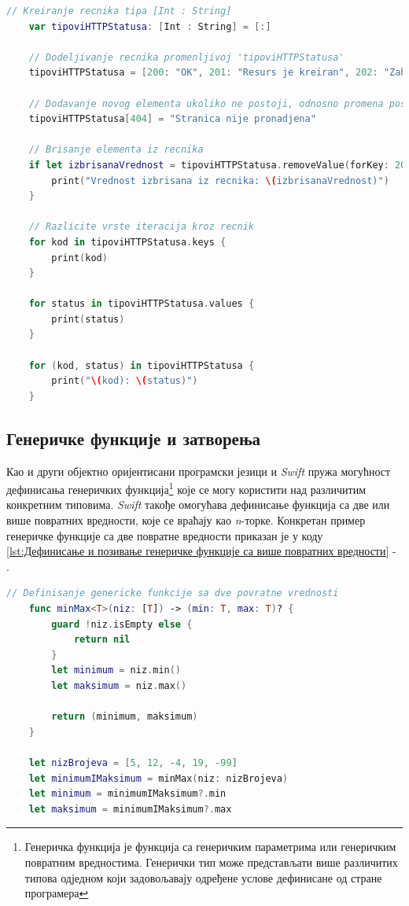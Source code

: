 \documentclass[12pt,oneside]{memoir}
\begin{document}
\begin{lstlisting}[caption=\textit{{Рад са речницима}}, label={lst:Рад са речницима}, language=Swift, frame=single]
    // Kreiranje recnika tipa [Int : String]
    var tipoviHTTPStatusa: [Int : String] = [:]
    
    // Dodeljivanje recnika promenljivoj 'tipoviHTTPStatusa'
    tipoviHTTPStatusa = [200: "OK", 201: "Resurs je kreiran", 202: "Zahtev je prihvacen"]
    
    // Dodavanje novog elementa ukoliko ne postoji, odnosno promena postojeceg
    tipoviHTTPStatusa[404] = "Stranica nije pronadjena"
    
    // Brisanje elementa iz recnika
    if let izbrisanaVrednost = tipoviHTTPStatusa.removeValue(forKey: 201) {
        print("Vrednost izbrisana iz recnika: \(izbrisanaVrednost)")
    }
    
    // Razlicite vrste iteracija kroz recnik
    for kod in tipoviHTTPStatusa.keys {
        print(kod)
    }
    
    for status in tipoviHTTPStatusa.values {
        print(status)
    }

    for (kod, status) in tipoviHTTPStatusa {
        print("\(kod): \(status)")
    }
\end{lstlisting}

\subsection{Генеричке функције и затворења}

\indent Као и други објектно оријентисани програмски језици и \textit{Swift} пружа могућност дефинисања генеричких функција\footnote{Генеричка функција је функција са генеричким параметрима или генеричким повратним вредностима. Генерички тип може представљати више различитих типова одједном који задовољавају одређене услове дефинисане од стране програмера} које се могу користити над различитим конкретним типовима. \textit{Swift} такође омогућава дефинисање функција са две или више повратних вредности, које се враћају као \textit{n}-торке. Конкретан пример генеричке функције са две повратне вредности приказан је у коду \ref{lst:Дефинисање и позивање генеричке функције са више повратних вредности} - . 

\begin{lstlisting}[caption=\textit{{Дефинисање и позивање генеричке функције са више повратних вредности}}, label={lst:Дефинисање и позивање генеричке  функције са више повратних вредности}, language=Swift, frame=single]
    // Definisanje genericke funkcije sa dve povratne vrednosti
    func minMax<T>(niz: [T]) -> (min: T, max: T)? {
        guard !niz.isEmpty else {
            return nil
        }
        let minimum = niz.min()
        let maksimum = niz.max()
        
        return (minimum, maksimum)
    }
    
    let nizBrojeva = [5, 12, -4, 19, -99]
    let minimumIMaksimum = minMax(niz: nizBrojeva)
    let minimum = minimumIMaksimum?.min
    let maksimum = minimumIMaksimum?.max
\end{lstlisting}
\end{document}
